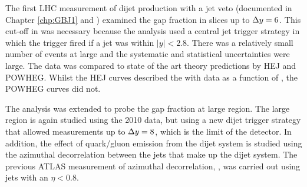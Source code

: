 The first LHC measurement of dijet production with a jet veto (documented in Chapter \ref{chp:GBJ1} and \cite{ref:ATLASGap}) examined the gap fraction in slices \ptb{} up to $\mbox{$\Delta y$}{}=6$.
This cut-off in \dy{} was necessary because the analysis used a central jet trigger strategy in which the trigger fired if a jet was within $|y|<2.8$.
There was a relatively small number of events at large \dy{} and the systematic and statistical uncertainties were large. 
The data was compared to state of the art theory predictions by HEJ and POWHEG.
Whilst the HEJ curves described the with data as a function of \dy{}, the POWHEG curves did not.

The analysis was extended to probe the gap fraction at large \dy{} region.
The large \dy{} region is again studied using the 2010 data, but using a new dijet trigger strategy that allowed measurements up to $\mbox{$\Delta y$}{}=8$, which is the limit of the detector.
In addition, the effect of quark/gluon emission from the dijet system is studied using the azimuthal decorrelation between the jets that make up the dijet system.
The previous ATLAS measurement of azimuthal decorrelation, \cite{ref:Decorr}, was carried out using jets with an $\eta{} < 0.8$.


